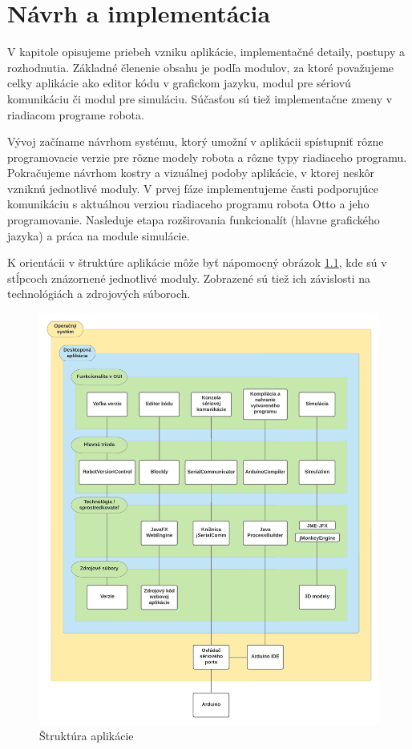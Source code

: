 
\chapter{Návrh a implementácia}
\label{kap:implementacia}

V kapitole opisujeme priebeh vzniku aplikácie, implementačné detaily, postupy a rozhodnutia. Základné členenie obsahu je podľa modulov, za ktoré považujeme celky aplikácie ako editor kódu v grafickom jazyku, modul pre sériovú komunikáciu či modul pre simuláciu. Súčasťou sú tiež implementačne zmeny v riadiacom programe robota.

Vývoj začíname návrhom systému, ktorý umožní v aplikácii spístupniť rôzne programovacie verzie pre rôzne modely robota a rôzne typy riadiaceho programu. Pokračujeme návrhom kostry a vizuálnej podoby aplikácie, v ktorej neskôr vzniknú jednotlivé moduly. V prvej fáze implementujeme časti podporujúce komunikáciu s aktuálnou verziou riadiaceho programu robota Otto a jeho programovanie. Nasleduje etapa rozširovania funkcionalít (hlavne grafického jazyka)  a práca na module simulácie.

K orientácii v štruktúre aplikácie môže byť nápomocný obrázok \ref{obr:app-structure}, kde sú v stĺpcoch znázornené jednotlivé moduly. Zobrazené sú tiež ich závislosti na technológiách a zdrojových súboroch.

\begin{figure}
\centerline{\includegraphics[width=1\textwidth]{images/app-structure}}
\caption[Štruktúra aplikácie]{Štruktúra aplikácie}
\label{obr:app-structure}
\end{figure}


